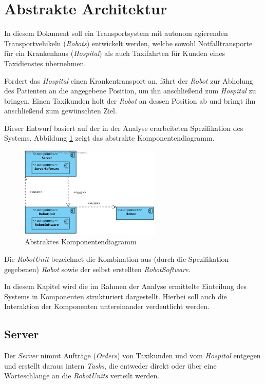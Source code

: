 \section{Abstrakte Architektur}
In diesem Dokument soll ein Transportsystem mit autonom agierenden Transportvehikeln (\emph{Robots}) entwickelt werden, welche sowohl Notfalltransporte für ein Krankenhaus (\emph{Hospital}) als auch Taxifahrten für Kunden eines Taxidienstes übernehmen. 

Fordert das \emph{Hospital} einen Krankentransport an, fährt der \emph{Robot} zur Abholung des Patienten an die angegebene Position, um ihn anschließend zum \emph{Hospital} zu bringen.
Einen Taxikunden holt der \emph{Robot} an dessen Position ab und bringt ihn anschließend zum gewünschten Ziel.

Dieser Entwurf basiert auf der in der Analyse erarbeiteten Spezifikation des Systems. Abbildung \ref{KomponentendiagrammAbstrakt} zeigt das abstrakte Komponentendiagramm.

\begin{figure}[H]
	\centering
	\includegraphics[width=0.6\textwidth]{img/AbstrakteArchitektur}
	\caption{Abstraktes Komponentendiagramm}
	\label{KomponentendiagrammAbstrakt}
\end{figure}

Die \emph{RobotUnit} bezeichnet die Kombination aus (durch die Spezifikation gegebenen) \emph{Robot} sowie der selbst erstellten \emph{RobotSoftware}.

In diesem Kapitel wird die im Rahmen der Analyse ermittelte Einteilung des Systems in Komponenten strukturiert dargestellt. 
Hierbei soll auch die Interaktion der Komponenten untereinander verdeutlicht werden.

\subsection{Server}

Der \emph{Server} nimmt Aufträge (\emph{Orders}) von Taxikunden und vom \emph{Hospital} entgegen und erstellt daraus intern \emph{Tasks}, die entweder direkt oder über eine Warteschlange an die \emph{RobotUnits} verteilt werden.

